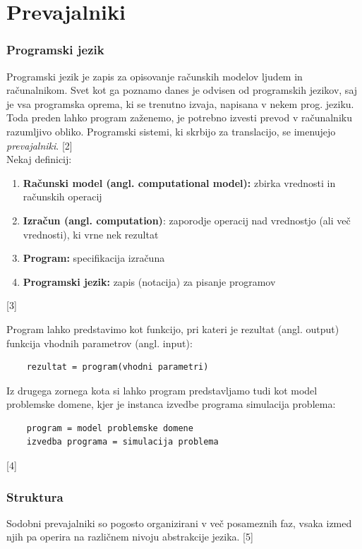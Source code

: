 \documentclass[a4paper, 12pt]{book}
\begin{document}
\chapter{Prevajalniki}
\label{ch0}

\subsection{Programski jezik}

Programski jezik je zapis za opisovanje računskih modelov ljudem in računalnikom. Svet kot ga poznamo danes je odvisen od programskih jezikov, saj je vsa programska oprema, ki se trenutno izvaja, napisana v nekem prog. jeziku. Toda preden lahko program zaženemo, je potrebno izvesti prevod v računalniku razumljivo obliko. Programski sistemi, ki skrbijo za translacijo, se imenujejo \textit{prevajalniki}. [2]\\
Nekaj definicij:
\begin{enumerate}  
	\item \textbf{Računski model (angl. computational model):} zbirka vrednosti in računskih operacij 
	\item \textbf{Izračun (angl. computation)}: zaporodje operacij nad vrednostjo (ali več vrednosti), ki vrne nek rezultat
	\item \textbf{Program:} specifikacija izračuna
	\item \textbf{Programski jezik:} zapis (notacija) za pisanje programov
\end{enumerate}
[3]

Program lahko predstavimo kot funkcijo, pri kateri je rezultat (angl. output) funkcija vhodnih parametrov (angl. input):
\begin{lstlisting}
	rezultat = program(vhodni parametri)
\end{lstlisting}

Iz drugega zornega kota si lahko program predstavljamo tudi kot model problemske domene, kjer je instanca izvedbe programa simulacija problema:
\begin{lstlisting}
	program = model problemske domene
	izvedba programa = simulacija problema
\end{lstlisting}
[4]

\subsection{Struktura}

Sodobni prevajalniki so pogosto organizirani v več posameznih faz, vsaka izmed njih pa operira na različnem nivoju abstrakcije jezika. [5]
\end{document}
